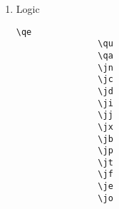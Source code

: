 \documentclass[10pt, a4paper]{article}
\begin{document}
\begin{enumerate}
\begin{center}
\begin{minipage}[h][5cm][t]{15em}
				\begin{lstlisting}[style=B]
				\mx
				\my
				\mz
				\mi
				\mj
				\ms
				\mr
				\mp
				\mq
				\end{lstlisting}
			\end{minipage}
			\begin{minipage}[h][5cm][t]{15em}
				\begin{fgls}
					\ \\
					\mx\\
					\my\\
					\mz\\
					\mi\\
					\mj\\
					\ms\\
					\mr\\
					\mp\\
					\mq
				\end{fgls}
			\end{minipage}
		\end{center}
		Each meta language constant exists in two forms: lowercase and uppercase. The uppercase version is represented by capitalizing the second letter of the command. Additionally, each constant has a secondary mode that automatically adds a space following the constant. To activate this mode, capitalize the first letter of the command. Both forms can be used simultaneously.
		\item Logic \begin{center}
			\begin{minipage}[h][8cm][t]{15em}
				\begin{lstlisting}[style=B]
				\qe
				\qu
				\qa
				\jn
				\jc
				\jd
				\ji
				\jj
				\jx
				\jb
				\jp
				\jt
				\jf
				\je
				\jo
				\end{lstlisting}
			\end{minipage}
			\begin{minipage}[h][8cm][t]{15em}
				\begin{fgls}
					\ \\
					\qe\\
					\qu\\
					\qa\\
					\jn\\
					\jc\\
					\jd\\
					\ji\\
					\jj\\
					\jx\\
					\jb\\
					\jp\\
					\jt\\
					\jf\\
					\je\\
					\jo
				\end{fgls}
			\end{minipage}
			

\end{center}
\end{enumerate}
\end{document}
